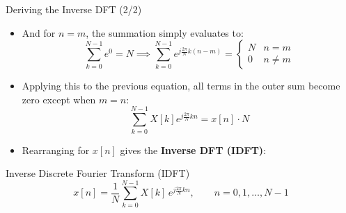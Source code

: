 \begin{frame}{Deriving the Inverse DFT (2/2)}
  \begin{itemize}
    \item And for $n = m$, the summation simply evaluates to:
      \begin{equation*}
        \sum_{k=0}^{N-1} e^0 = N \implies \sum_{k=0}^{N-1} e^{j\frac{2\pi}{N}k(n-m)} =
        \begin{cases} N & n = m \\ 0 & n \neq m
        \end{cases}
      \end{equation*}
    \item Applying this to the previous equation, all terms in the outer sum become zero except when $m=n$:
      \begin{equation*}
        \sum_{k=0}^{N-1} X[k] e^{j\frac{2\pi}{N}kn} = x[n] \cdot N
      \end{equation*}
    \item Rearranging for $x[n]$ gives the \textbf{Inverse DFT (IDFT)}:
  \end{itemize}
  \vspace{0.1cm}
  \begin{conceptbox}{Inverse Discrete Fourier Transform (IDFT)}
    \vspace{-0.2cm}
    \begin{equation*}
      x[n] = \frac{1}{N}\sum_{k=0}^{N-1} X[k]\,e^{j\frac{2\pi}{N}kn}, \qquad n=0,1,\dots,N-1
    \end{equation*}
  \end{conceptbox}

\end{frame}
